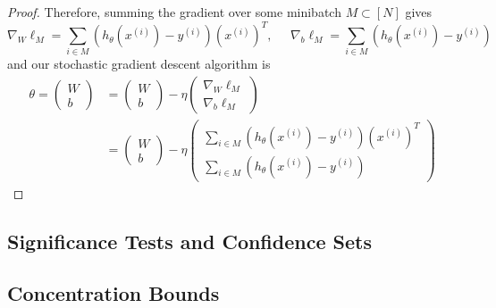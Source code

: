 \begin{proof}
    Therefore, summing the gradient over some minibatch $M \subset [N]$ gives 
    \begin{equation}
      \nabla_{W} \ell_M = \sum_{i \in M} (h_{\theta}(x^{(i)}) - y^{(i)}) (x^{(i)})^T, \;\;\;\;\; \nabla_{b} \ell_M = \sum_{i \in M} (h_{\theta}(x^{(i)}) - y^{(i)})
    \end{equation}
    and our stochastic gradient descent algorithm is 
    \begin{align*}
      \theta = \begin{pmatrix} W \\ b \end{pmatrix} & = \begin{pmatrix} W \\ b \end{pmatrix} - \eta \begin{pmatrix} \nabla_{W} \ell_M \\ \nabla_{b} \ell_M \end{pmatrix} \\
      & = \begin{pmatrix} W \\ b \end{pmatrix} - \eta \begin{pmatrix} \sum_{i \in M} (h_{\theta}(x^{(i)}) - y^{(i)}) (x^{(i)})^T \\ \sum_{i \in M} (h_{\theta}(x^{(i)}) - y^{(i)}) \end{pmatrix} 
    \end{align*}
  \end{proof}

\subsection{Significance Tests and Confidence Sets}

\subsection{Concentration Bounds}

